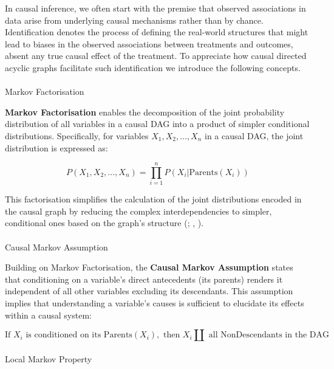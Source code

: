 \documentclass[
  single column]{article}
\makeatletter
\let\oldparagraph\paragraph
\renewcommand{\paragraph}{
    \@ifstar
      \xxxParagraphStar
      \xxxParagraphNoStar
  }
\newcommand{\xxxParagraphStar}[1]{\oldparagraph*{#1}\mbox{}}
\newcommand{\xxxParagraphNoStar}[1]{\oldparagraph{#1}\mbox{}}
\makeatother
\begin{document}
In causal inference, we often start with the premise that observed
associations in data arise from underlying causal mechanisms rather than
by chance. Identification denotes the process of defining the real-world
structures that might lead to biases in the observed associations
between treatments and outcomes, absent any true causal effect of the
treatment. To appreciate how causal directed acyclic graphs facilitate
such identification we introduce the following concepts.

\paragraph{Markov Factorisation}\label{markov-factorisation}

\textbf{Markov Factorisation} enables the decomposition of the joint
probability distribution of all variables in a causal DAG into a product
of simpler conditional distributions. Specifically, for variables
\(X_1, X_2, \dots, X_n\) in a causal DAG, the joint distribution is
expressed as:

\[
P(X_1, X_2, \dots, X_n) = \prod_{i=1}^{n} P(X_i | \text{Parents}(X_i))
\]

This factorisation simplifies the calculation of the joint distributions
encoded in the causal graph by reducing the complex interdependencies to
simpler, conditional ones based on the graph's structure
(;
, ).

\paragraph{Causal Markov Assumption}\label{causal-markov-assumption}

Building on Markov Factorisation, the \textbf{Causal Markov Assumption}
states that conditioning on a variable's direct antecedents (its
parents) renders it independent of all other variables excluding its
descendants. This assumption implies that understanding a variable's
causes is sufficient to elucidate its effects within a causal system:

\[
\text{If } X_i \text{ is conditioned on its Parents}(X_i), \text{ then } X_i \coprod \text{ all NonDescendants in the DAG}
\]

\paragraph{Local Markov Property}\label{local-markov-property}
\end{document}
